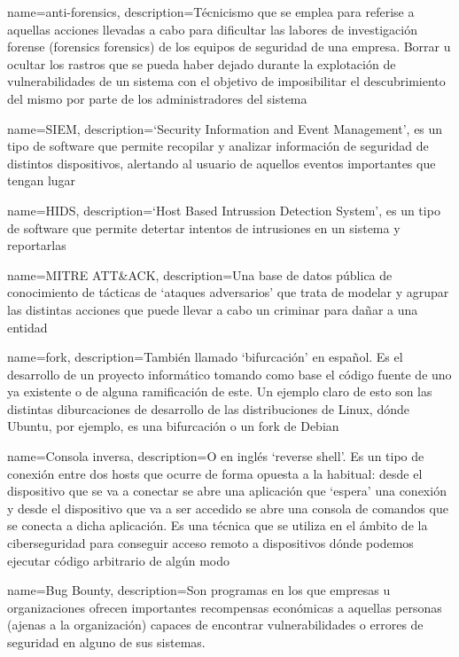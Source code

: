 {
    name=anti-forensics,
    description={Técnicismo que se emplea para referise a aquellas acciones llevadas a cabo para dificultar las labores de investigación forense (forensics \gls{forensics}) de los equipos de seguridad de una empresa. Borrar u ocultar los rastros que se pueda haber dejado durante la explotación de vulnerabilidades de un sistema con el objetivo de imposibilitar el descubrimiento del mismo por parte de los administradores del sistema}
}

{
    name=SIEM,
    description={`Security Information and Event Management', es un tipo de software que permite recopilar y analizar información de seguridad de distintos dispositivos, alertando al usuario de aquellos eventos importantes que tengan lugar}
}


{
    name=HIDS,
    description={`Host Based Intrussion Detection System', es un tipo de software que permite detertar intentos de intrusiones en un sistema y reportarlas}
}

{
    name=MITRE ATT\&ACK,
    description={Una base de datos pública de conocimiento de tácticas de `ataques adversarios' que trata de modelar y agrupar las distintas acciones que puede llevar a cabo un criminar para dañar a una entidad}
}

{
    name=fork,
    description={También llamado `bifurcación' en español. Es el desarrollo de un proyecto informático tomando como base el código fuente de uno ya existente o de alguna ramificación de este. Un ejemplo claro de esto son las distintas diburcaciones de desarrollo de las distribuciones de Linux, dónde Ubuntu, por ejemplo, es una bifurcación o un fork de Debian}
}

{
    name=Consola inversa,
    description={O en inglés `reverse shell'. Es un tipo de conexión entre dos hosts que ocurre de forma opuesta a la habitual: desde el dispositivo que se va a conectar se abre una aplicación que `espera' una conexión y desde el dispositivo que va a ser accedido se abre una consola de comandos que se conecta a dicha aplicación. Es una técnica que se utiliza en el ámbito de la ciberseguridad para conseguir acceso remoto a dispositivos dónde podemos ejecutar código arbitrario de algún modo}
}

{
    name=Bug Bounty,
    description={Son programas en los que empresas u organizaciones ofrecen importantes recompensas económicas a aquellas personas (ajenas a la organización) capaces de encontrar vulnerabilidades o errores de seguridad en alguno de sus sistemas.}
}